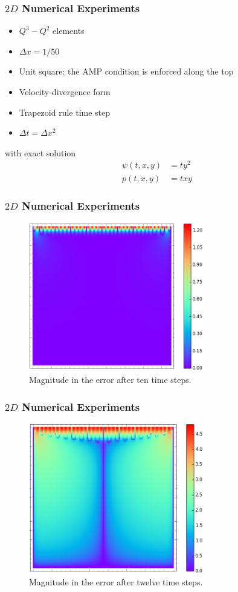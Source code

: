 \documentclass[8pt]{beamer}
\begin{document}
\begin{frame}
    \frametitle{\(2D\) Numerical Experiments}
    \begin{itemize}
        \item \(Q^3-Q^2\) elements
        \item \(\Delta x = 1/50\)
        \item Unit square: the AMP condition is enforced along the top
        \item Velocity-divergence form
        \item Trapezoid rule time step
        \item \(\Delta t = \Delta x^2\)
    \end{itemize}
    with exact solution
    \begin{align}
        \psi(t, x, y) &= t y^2                                                \\
        p(t, x, y)    &= t x y
    \end{align}
\end{frame}

\begin{frame}
    \frametitle{\(2D\) Numerical Experiments}
    \begin{figure}
        \centering
        \includegraphics[width=3in]{v1-10.png}

        \caption{Magnitude in the error after ten time steps.}
    \end{figure}
\end{frame}

\begin{frame}
    \frametitle{\(2D\) Numerical Experiments}
    \begin{figure}
        \centering
        \includegraphics[width=3in]{v1-12.png}

        \caption{Magnitude in the error after twelve time steps.}
    \end{figure}
\end{frame}
\end{document}
